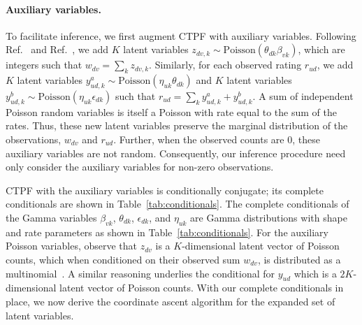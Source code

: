 \documentclass{article}
\newcommand{\mytab}[1]{Table~\ref{tab:#1}}
\newcommand{\Pois}{\textrm{Poisson}}
\begin{document}
\paragraph{Auxiliary variables.} To facilitate inference, we first augment
CTPF with auxiliary variables. Following Ref.~\cite{Dunson:2005} and
Ref.~\cite{Gopalan:2013b}, we add $K$ latent variables $z_{dv,k} \sim
\Pois(\theta_{dk} \beta_{vk})$, which are integers such that $w_{dv} =
\sum_k z_{dv,k}$.  Similarly, for each observed rating $r_{ud}$, we
add $K$ latent variables $y_{ud,k}^a \sim \Pois(\eta_{uk}
\theta_{dk})$ and $K$ latent variables $y_{ud,k}^b \sim
\Pois(\eta_{uk} \epsilon_{dk})$ such that $r_{ud} = \sum_k y_{ud,k}^a
+ y_{ud,k}^b$. A sum of independent Poisson random variables is itself
a Poisson with rate equal to the sum of the rates. Thus, these new
latent variables preserve the marginal distribution of the
observations, $w_{dv}$ and $r_{ud}$.
Further, when the observed counts are 0, these auxiliary variables are
not random. Consequently, our inference procedure need only consider
the auxiliary variables for non-zero observations.

CTPF with the auxiliary variables is conditionally conjugate; its
complete conditionals are shown in \mytab{conditionals}. The complete
conditionals of the Gamma variables $\beta_{vk}$, $\theta_{dk}$,
$\epsilon_{dk}$, and $\eta_{uk}$ are Gamma distributions with shape
and rate parameters as shown in \mytab{conditionals}. For the
auxiliary Poisson variables, observe that $z_{dv}$ is a
$K$-dimensional latent vector of Poisson counts, which when
conditioned on their observed sum $w_{dv}$, is distributed as a
multinomial~\cite{Johnson:2005, Cemgil:2009}. A similar reasoning
underlies the conditional for $y_{ud}$ which is a $2K$-dimensional
latent vector of Poisson counts.  With our complete conditionals in
place, we now derive the coordinate ascent algorithm for the expanded
set of latent variables.
\end{document}
